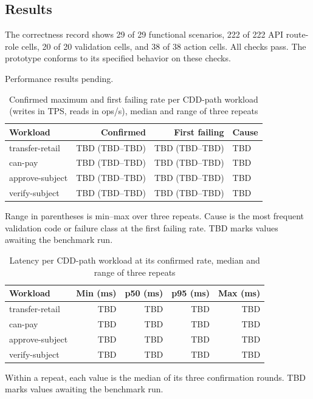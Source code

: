 \documentclass[conference]{IEEEtran}
\begin{document}
\subsection{Results}
The correctness record shows 29 of 29 functional scenarios, 222 of 222 API
route-role cells, 20 of 20 validation cells, and 38 of 38 action cells. All checks pass. The prototype conforms to its specified behavior on
these checks.

Performance results pending.

\begin{table}[!t]
\caption{Confirmed maximum and first failing rate per CDD-path workload (writes in TPS, reads in ops/s), median and range of three repeats}
\label{tab:capacity}
\centering
\scriptsize
\setlength{\tabcolsep}{3pt}
\begin{tabular}{@{}lrrl@{}}
\toprule
\textbf{Workload} & \textbf{Confirmed} & \textbf{First failing} & \textbf{Cause} \\
\midrule
transfer-retail & TBD (TBD--TBD) & TBD (TBD--TBD) & TBD \\
can-pay & TBD (TBD--TBD) & TBD (TBD--TBD) & TBD \\
approve-subject & TBD (TBD--TBD) & TBD (TBD--TBD) & TBD \\
verify-subject & TBD (TBD--TBD) & TBD (TBD--TBD) & TBD \\
\bottomrule
\end{tabular}

\vspace{2pt}
{\scriptsize Range in parentheses is min--max over three repeats. Cause is the most frequent validation code or failure class at the first failing rate. TBD marks values awaiting the benchmark run.}
\end{table}

\begin{table}[!t]
\caption{Latency per CDD-path workload at its confirmed rate, median and range of three repeats}
\label{tab:latency}
\centering
\scriptsize
\setlength{\tabcolsep}{3pt}
\begin{tabular}{@{}lrrrr@{}}
\toprule
\textbf{Workload} & \textbf{Min (ms)} & \textbf{p50 (ms)} & \textbf{p95 (ms)} & \textbf{Max (ms)} \\
\midrule
transfer-retail & TBD & TBD & TBD & TBD \\
can-pay & TBD & TBD & TBD & TBD \\
approve-subject & TBD & TBD & TBD & TBD \\
verify-subject & TBD & TBD & TBD & TBD \\
\bottomrule
\end{tabular}

\vspace{2pt}
{\scriptsize Within a repeat, each value is the median of its three confirmation rounds. TBD marks values awaiting the benchmark run.}
\end{table}
\end{document}
